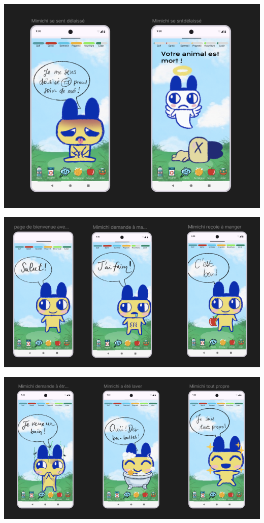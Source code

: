 \documentclass{cahier_des_charges}
\begin{document}
\begin{minipage}[t]{0.48\textwidth}
    \includegraphics[width=\linewidth]{maquette/screen7.png}
\end{minipage}
\hfill
\begin{minipage}[t]{0.48\textwidth}
    \includegraphics[width=\linewidth]{maquette/screen2.png}
\end{minipage}\par\vspace{0.3cm}

\begin{minipage}[t]{0.48\textwidth}
    \includegraphics[width=\linewidth]{maquette/screen3.png}
\end{minipage}
\end{document}

